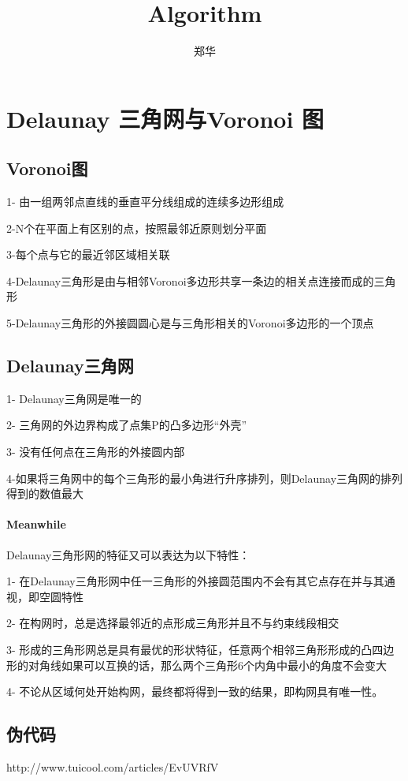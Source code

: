 \documentclass[UTF8,a4paper,8pt]{ctexart}
\author{郑华}
\title{Algorithm}
\begin{document}
 	\maketitle

\newpage 
\section{Delaunay 三角网与Voronoi 图}
     
     \subsection{Voronoi图}
     1- 由一组两邻点直线的垂直平分线组成的连续多边形组成
     
     2-N个在平面上有区别的点，按照最邻近原则划分平面
     
     3-每个点与它的最近邻区域相关联
     
     4-Delaunay三角形是由与相邻Voronoi多边形共享一条边的相关点连接而成的三角形
     
     5-Delaunay三角形的外接圆圆心是与三角形相关的Voronoi多边形的一个顶点
     
	 \subsection{Delaunay三角网}
	 1- Delaunay三角网是唯一的
	 
	 2- 三角网的外边界构成了点集P的凸多边形“外壳”
	 
	 3- 没有任何点在三角形的外接圆内部
	 
	 4-如果将三角网中的每个三角形的最小角进行升序排列，则Delaunay三角网的排列得到的数值最大
	 
	 \paragraph{Meanwhile}Delaunay三角形网的特征又可以表达为以下特性：
	 
	 1- 在Delaunay三角形网中任一三角形的外接圆范围内不会有其它点存在并与其通视，即空圆特性
	 
	 2- 在构网时，总是选择最邻近的点形成三角形并且不与约束线段相交
	 
	 3- 形成的三角形网总是具有最优的形状特征，任意两个相邻三角形形成的凸四边形的对角线如果可以互换的话，那么两个三角形6个内角中最小的角度不会变大
	 
	 4- 不论从区域何处开始构网，最终都将得到一致的结果，即构网具有唯一性。
	 
	 \subsection{伪代码}http://www.tuicool.com/articles/EvUVRfV
	 
\end{document}
